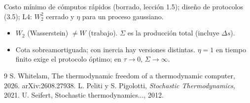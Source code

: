\documentclass[11pt,a4paper]{article}
\begin{document}
\begin{aplicacion}
Costo mínimo de cómputos rápidos (borrado, lección 1.5); diseño de protocolos (3.5); L4: $W_2^2$ cerrado y $\eta$ para un proceso gaussiano.
\end{aplicacion}

\begin{error}
\begin{itemize}[nosep]
\item $W_2$ (Wasserstein) $\neq W$ (trabajo). \quad $\Sigma$ es la producción total (incluye $\Delta s$).
\item Cota sobreamortiguada; con inercia hay versiones distintas. \quad $\eta=1$ en tiempo finito exige el protocolo óptimo; en $\tau\to0$, $\Sigma\to\infty$.
\end{itemize}
\end{error}

\begin{thebibliography}{9}\small
{} S. Whitelam, The thermodynamic freedom of a thermodynamic computer, 2026. arXiv:2608.27938.
 L. Peliti y S. Pigolotti, \emph{Stochastic Thermodynamics}, 2021.
 U. Seifert, Stochastic thermodynamics..., 2012.
\end{thebibliography}
\end{document}
